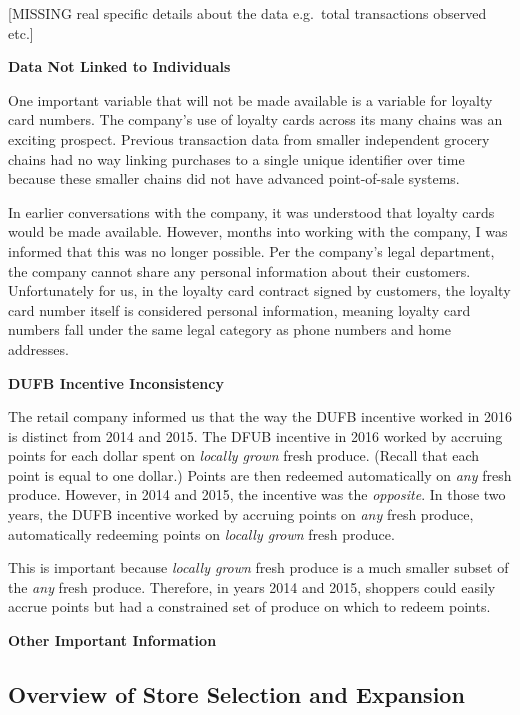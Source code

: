 \documentclass[12pt,letterpaperpaper,]{book}
\begin{document}
{[}MISSING real specific details about the data e.g.~total transactions
observed etc.{]}

\textbf{Data Not Linked to Individuals}

One important variable that will not be made available is a variable for
loyalty card numbers. The company's use of loyalty cards across its many
chains was an exciting prospect. Previous transaction data from smaller
independent grocery chains had no way linking purchases to a single
unique identifier over time because these smaller chains did not have
advanced point-of-sale systems.

In earlier conversations with the company, it was understood that
loyalty cards would be made available. However, months into working with
the company, I was informed that this was no longer possible. Per the
company's legal department, the company cannot share any personal
information about their customers. Unfortunately for us, in the loyalty
card contract signed by customers, the loyalty card number itself is
considered personal information, meaning loyalty card numbers fall under
the same legal category as phone numbers and home addresses.

\textbf{DUFB Incentive Inconsistency}

The retail company informed us that the way the DUFB incentive worked in
2016 is distinct from 2014 and 2015. The DFUB incentive in 2016 worked
by accruing points for each dollar spent on \emph{locally grown} fresh
produce. (Recall that each point is equal to one dollar.) Points are
then redeemed automatically on \emph{any} fresh produce. However, in
2014 and 2015, the incentive was the \emph{opposite}. In those two
years, the DUFB incentive worked by accruing points on \emph{any} fresh
produce, automatically redeeming points on \emph{locally grown} fresh
produce.

This is important because \emph{locally grown} fresh produce is a much
smaller subset of the \emph{any} fresh produce. Therefore, in years 2014
and 2015, shoppers could easily accrue points but had a constrained set
of produce on which to redeem points.

\textbf{Other Important Information}

\subsection*{Overview of Store Selection and
Expansion}\label{overview-of-store-selection-and-expansion}
\end{document}
